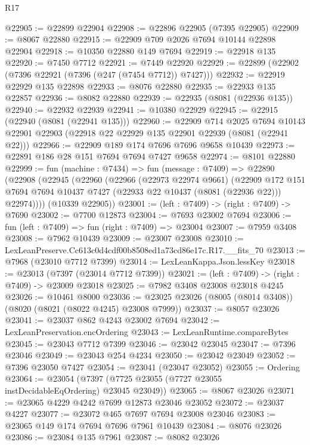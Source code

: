 \begin{lexlean}{R17}
\begin{coremodule}
@22905 := @22899 @22904
@22908 := @22896 @22905 (@7395 @22905)
@22909 := @8067 @22880
@22915 := @22909 @709 @2026 @7694 @10144 @22898 @22904
@22918 := @10350 @22880 @149 @7694
@22919 := @22918 @135
@22920 := @7450 @7712
@22921 := @7449 @22920
@22929 := @22899 (@22902 (@7396 @22921 (@7396 (@247 (@7454 @7712)) @7427)))
@22932 := @22919 @22929 @135 @22898
@22933 := @8076 @22880
@22935 := @22933 @135 @22857
@22936 := @8082 @22880
@22939 := @22935 (@8081 (@22936 @135))
@22940 := @22932 @22939
@22941 := @10380 @22929
@22945 := @22915 (@22940 (@8081 (@22941 @135)))
@22960 := @22909
    @714
    @2025
    @7694
    @10143
    @22901
    @22903
    (@22918 @22 @22929 @135 @22901 @22939 (@8081 (@22941 @22)))
@22966 := @22909 @189 @174 @7696 @7696 @9658 @10439
@22973 := @22891 @186 @28 @151 @7694 @7694 @7427 @9658
@22974 := @8101 @22880
@22999 := fun (machine : @7434) =>
  fun (message : @7409) =>
  @22890
    (@22908
      (@22945
        (@22960
          (@22966
            (@22973 @22974 @9661)
            (@22909
              @172
              @151
              @7694
              @7694
              @10437
              @7427
              (@22933 @22 @10437 (@8081 (@22936 @22)))
              @22974))))
      (@10339 @22905))
@23001 := (left : @7409) -> (right : @7409) -> @7690
@23002 := @7700 @12873
@23004 := @7693 @23002 @7694
@23006 := fun (left : @7409) => fun (right : @7409) => @23004
@23007 := @7959 @3408
@23008 := @7962 @10439
@23009 := @23007 @23008
@23010 := LexLeanPreserve.Cc613c0d4cdf00b8508ed1a73cd86e17c.R17.__fits_70
@23013 := @7968 (@23010 @7712 @7399)
@23014 := LexLeanKappa.Json.lessKey
@23018 := @23013 (@7397 (@23014 @7712 @7399))
@23021 := (left : @7409) -> (right : @7409) -> @23009 @23018
@23025 := @7982 @3408 @23008 @23018 @4245
@23026 := @10461 @8000
@23036 := @23025 @23026 (@8005 (@8014 @3408)) (@8020 (@8021 (@8022 @4245) @23008 @7999))
@23037 := @8057 @23026
@23041 := @23037 @862 @4243 @23002 @7694
@23042 := LexLeanPreservation.encOrdering
@23043 := LexLeanRuntime.compareBytes
@23045 := @23043 @7712 @7399
@23046 := @23042 @23045
@23047 := @7396 @23046
@23049 := @23043 @254 @4234
@23050 := @23042 @23049
@23052 := @7396 @23050 @7427
@23054 := @23041 (@23047 @23052)
@23055 := Ordering
@23064 := @23054 (@7397 (@7725 @23055 (@7727 @23055 instDecidableEqOrdering) @23045 @23049))
@23065 := @8067 @23026
@23071 := @23065 @4229 @4242 @7699 @12873 @23046 @23052
@23072 := @23037 @4227
@23077 := @23072 @465 @7697 @7694 @23008 @23046
@23083 := @23065 @149 @174 @7694 @7696 @7961 @10439
@23084 := @8076 @23026
@23086 := @23084 @135 @7961
@23087 := @8082 @23026

\end{coremodule}
\end{lexlean}
